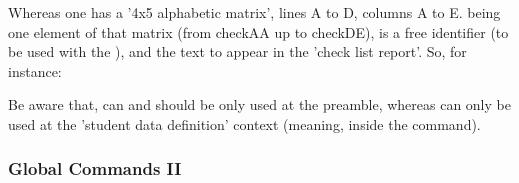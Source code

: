 \documentclass[dctools,english]{ufrgscca} %
\begin{document}
\begin{Macros}{\checkdef}%
	\begin{Syntax}%
	\end{Syntax}
Whereas one has a '4x5 alphabetic matrix', lines A to D, columns A to E.  being one element of that matrix (from checkAA up to checkDE),  is a free identifier (to be used with the \Macro{\checklist}{}), and  the text to appear in the 'check list report'.  So, for instance:

\begin{stcode}[st=d.check]


\end{stcode}



Be aware that, \Macro{\checkdef}{} can and should be only used at the preamble, whereas \Macro{\checklist}{} can only be used at the 'student data definition' context (meaning, inside the \Macro{\NewStudent}{} command).
\end{Macros}


\subsubsection{Global Commands II}\label{new-student}
\end{document}
